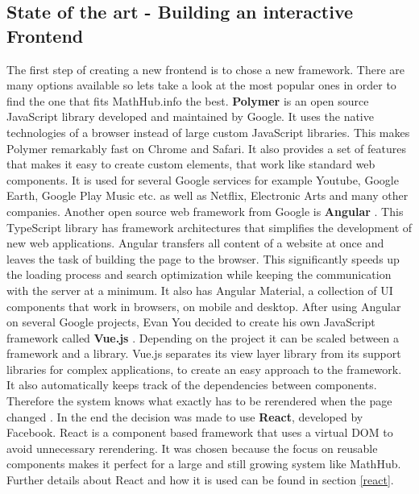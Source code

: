 \documentclass[11pt,a4paper]{article}
\begin{document}
\subsection{State of the art - Building an interactive Frontend} \label{SoA}
The first step of creating a new frontend is to chose a new framework.
There are many options available so lets take a look at the most popular ones in order to find the one that fits MathHub.info the best.
\newline \newline
\textbf{Polymer} \cite{polymer} is an open source JavaScript library developed and maintained by Google.
It uses the native technologies of a browser instead of large custom JavaScript libraries.
This makes Polymer remarkably fast on Chrome and Safari.
It also provides a set of features that makes it easy to create custom elements, that work like standard web components.
It is used for several Google services for example Youtube, Google Earth, Google Play Music etc. as well as Netflix, Electronic Arts and many other companies. 
\newline \newline
Another open source web framework from Google is \textbf{Angular} \cite{angular}.
This TypeScript library has framework architectures that simplifies the development of new web applications.
Angular transfers all content of a website at once and leaves the task of building the page to the browser.
This significantly speeds up the loading process and search optimization while keeping the communication with the server at a minimum. 
It also has Angular Material, a collection of UI components that work in browsers, on mobile and desktop.
\newline \newline
After using Angular on several Google projects, Evan You decided to create his own JavaScript framework called \textbf{Vue.js} \cite{vuewiki}.
Depending on the project it can be scaled between a framework and a library.
Vue.js separates its view layer library from its support libraries for complex applications, to create an easy approach to the framework.
It also automatically keeps track of the dependencies between components.
Therefore the system knows what exactly has to be rerendered when the page changed \cite{vuegit}.
\newline \newline
In the end the decision was made to use \textbf{React}, developed by Facebook.
React is a component based framework that uses a virtual DOM to avoid unnecessary rerendering.
It was chosen because the focus on reusable components makes it perfect for a large and still growing system like MathHub.
Further details about React and how it is used can be found in section \ref{react}.
\end{document}
